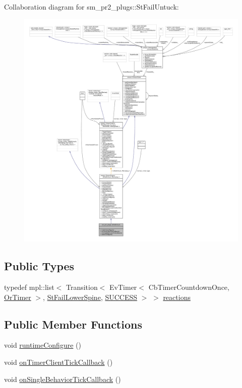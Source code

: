 Collaboration diagram for sm\+\_\+pr2\+\_\+plugs\+:\+:St\+Fail\+Untuck\+:
\nopagebreak
\begin{figure}[H]
\begin{center}
\leavevmode
\includegraphics[width=350pt]{structsm__pr2__plugs_1_1StFailUntuck__coll__graph}
\end{center}
\end{figure}
\subsection*{Public Types}
\begin{DoxyCompactItemize}
\item 
typedef mpl\+::list$<$ Transition$<$ Ev\+Timer$<$ Cb\+Timer\+Countdown\+Once, \hyperlink{classsm__pr2__plugs_1_1OrTimer}{Or\+Timer} $>$, \hyperlink{structsm__pr2__plugs_1_1StFailLowerSpine}{St\+Fail\+Lower\+Spine}, \hyperlink{classSUCCESS}{S\+U\+C\+C\+E\+SS} $>$ $>$ \hyperlink{structsm__pr2__plugs_1_1StFailUntuck_a0bdd7212772e86a51482f6b7cd162866}{reactions}
\end{DoxyCompactItemize}
\subsection*{Public Member Functions}
\begin{DoxyCompactItemize}
\item 
void \hyperlink{structsm__pr2__plugs_1_1StFailUntuck_af2e650b9c6962deb4740dd3e085a9978}{runtime\+Configure} ()
\item 
void \hyperlink{structsm__pr2__plugs_1_1StFailUntuck_a8b5c97b9980e1e8013f78a1e452621e9}{on\+Timer\+Client\+Tick\+Callback} ()
\item 
void \hyperlink{structsm__pr2__plugs_1_1StFailUntuck_a5aca3bee084f0d3df264ed2d973f291a}{on\+Single\+Behavior\+Tick\+Callback} ()
\end{DoxyCompactItemize}
